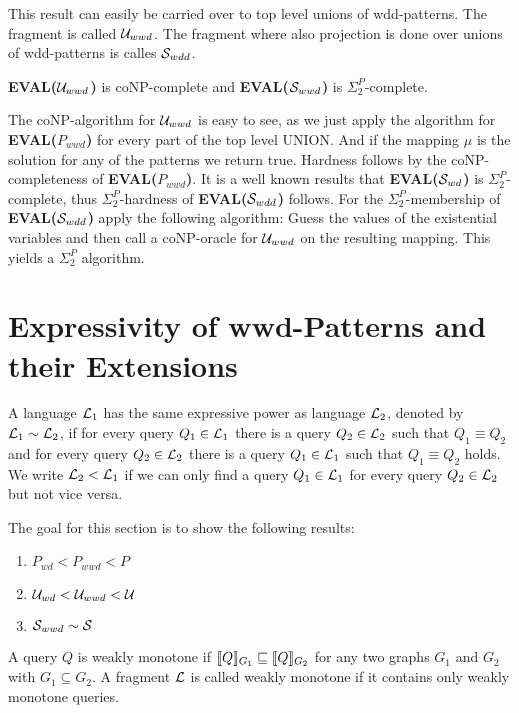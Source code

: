 This result can easily be carried over to top level unions of wdd-patterns. The fragment
is called $\mathcal{U}_{wwd}$. The fragment where also projection is done over unions of
wdd-patterns is calles $\mathcal{S}_{wdd}$.

\begin{corollary}
	\textbf{EVAL($\mathcal{U}_{wwd}$)} is coNP-complete and \textbf{EVAL($\mathcal{S}_{wwd}$)} is
	$\Sigma^P_2$-complete.
\end{corollary}
\begin{proofidea}
	The coNP-algorithm for $\mathcal{U}_{wwd}$ is easy to see, as we just apply the
	algorithm for  \textbf{EVAL($P_{wwd}$)} for every part of the top level UNION. And
	if the mapping $\mu$ is the solution for any of the patterns we return
	true. Hardness follows by the coNP-completeness of \textbf{EVAL($P_{wwd}$)}.
	It is a well known results that \textbf{EVAL($\mathcal{S}_{wd}$)} is $\Sigma^P_2$-complete,
	thus $\Sigma^P_2$-hardness of \textbf{EVAL($\mathcal{S}_{wdd}$)} follows. 
	For the $\Sigma^P_2$-membership of \textbf{EVAL($\mathcal{S}_{wdd}$)} apply the following algorithm:
	Guess the values of the existential variables and then call a coNP-oracle
	for $\mathcal{U}_{wwd}$ on the resulting mapping. This yields a $\Sigma^P_2$ algorithm.
\end{proofidea}

\section{Expressivity of wwd-Patterns and their Extensions}

\begin{definition}
	A language $\mathcal{L}_1$ has the same expressive power as language $\mathcal{L}_2$, denoted by
	$\mathcal{L}_1 \sim \mathcal{L}_2$, if for every query $Q_1 \in \mathcal{L}_1$ there is a query $Q_2 \in
	\mathcal{L}_2$ such that $Q_1 \equiv Q_2$ and for every query $Q_2 \in \mathcal{L}_2$ there is a
	query $Q_1 \in \mathcal{L}_1$ such that $Q_1 \equiv Q_2$ holds. 
	We write $\mathcal{L}_2 < \mathcal{L}_1$ if we can only find a query $Q_1 \in \mathcal{L}_1$ for every
	query $Q_2 \in \mathcal{L}_2$ but not vice versa.
\end{definition}
The goal for this section is to show the following results: 
\begin{enumerate}
	\item $P_{wd} < P_{wwd} <P$
	\item $\mathcal{U}_{wd} < \mathcal{U}_{wwd} < \mathcal{U}$
	\item $\mathcal{S}_{wwd} \sim \mathcal{S}$
\end{enumerate}
\begin{definition}
	A query $Q$ is weakly monotone if $\llbracket Q \rrbracket_{G_1} \sqsubseteq \llbracket Q
	\rrbracket_{G_2}$ for any two graphs $G_1$ and $G_2$ with $G_1 \subseteq G_2$.
	A fragment $\mathcal{L}$ is called weakly monotone if it contains only weakly
	monotone queries.
\end{definition}


